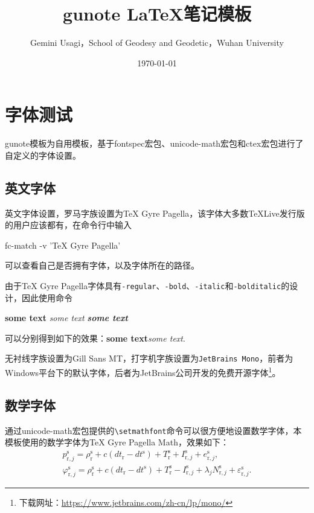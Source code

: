 \documentclass{gunote}
\title{gunote \LaTeX{}笔记模板}
\author{Gemini Usagi，School of Geodesy and Geodetic，Wuhan University}
\date{\today}
\newcommand{\cmd}[1]{\texttt{\backslash #1}}
\begin{document}
\maketitle
\tableofcontents

\section{字体测试}
\textsf{gunote}模板为自用模板，基于\textsf{fontspec}宏包、\textsf{unicode-math}宏包和\textsf{ctex}宏包进行了自定义的字体设置。
\subsection{英文字体}
英文字体设置，罗马字族设置为TeX Gyre Pagella，该字体大多数\TeX{}Live发行版的用户应该都有，在命令行中输入
\begin{Code*}[text]
fc-match -v 'TeX Gyre Pagella'
\end{Code*}
可以查看自己是否拥有字体，以及字体所在的路径。
\begin{Code*}[latex]
\setmainfont{TeX Gyre Pagella}
\end{Code*}
由于TeX Gyre Pagella字体具有\texttt{-regular}、\texttt{-bold}、\texttt{-italic}和\texttt{-bolditalic}的设计，因此使用命令
\begin{Code*}[latex]
\textbf{some text}
\textit{some text}
{\bfseries\itshape some text}
\end{Code*}
可以分别得到如下的效果：\textbf{some text}\quad\textit{some text}.

无衬线字族设置为\textsf{Gill Sans MT}，打字机字族设置为\texttt{JetBrains Mono}，前者为Windows平台下的默认字体，后者为JetBrains公司开发的免费开源字体\footnote{下载网址：\url{https://www.jetbrains.com/zh-cn/lp/mono/}}。
\subsection{数学字体}
通过\textsf{unicode-math}宏包提供的\cmd{setmathfont}命令可以很方便地设置数学字体，本模板使用的数学字体为TeX Gyre Pagella Math，效果如下：
{
\def\rcv{\mathrm{r}}
\def\sat{\mathrm{s}}
\begin{gather}
  p_{\rcv,j}^\sat=\rho_\rcv^\sat+c(dt_\rcv-dt^\sat)+T_\rcv^\sat+I_{\rcv,j}^\sat+e_{\rcv,j}^\sat,\\
  \varphi_{\rcv,j}^\sat=\rho_\rcv^\sat+c(dt_\rcv-dt^\sat)+T_\rcv^\sat-I_{\rcv,j}^\sat+\lambda_j N_{\rcv,j}^\sat+\varepsilon_{\rcv,j}^\sat.
\end{gather}
}
\end{document}
